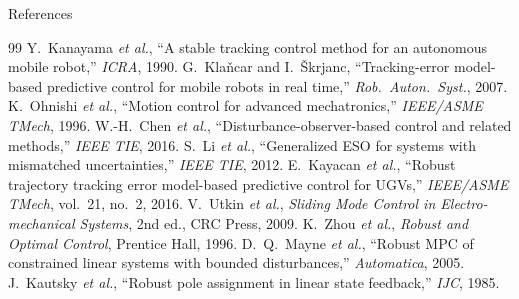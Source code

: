 \documentclass[10pt,aspectratio=169]{beamer}
\begin{document}
\begin{frame}[allowframebreaks]{References}
  \footnotesize
  \begin{thebibliography}{99}
     Y.~Kanayama \textit{et al.},
      ``A stable tracking control method for an autonomous mobile robot,''
      \emph{ICRA}, 1990.
     G.~Kla\v{n}car and I.~\v{S}krjanc,
      ``Tracking-error model-based predictive control for mobile robots
      in real time,'' \emph{Rob.\ Auton.\ Syst.}, 2007.
     K.~Ohnishi \textit{et al.},
      ``Motion control for advanced mechatronics,''
      \emph{IEEE/ASME TMech}, 1996.
     W.-H.\ Chen \textit{et al.},
      ``Disturbance-observer-based control and related methods,''
      \emph{IEEE TIE}, 2016.
     S.~Li \textit{et al.},
      ``Generalized ESO for systems with mismatched uncertainties,''
      \emph{IEEE TIE}, 2012.
     E.~Kayacan \textit{et al.},
      ``Robust trajectory tracking error model-based predictive control
      for UGVs,'' \emph{IEEE/ASME TMech}, vol.~21, no.~2, 2016.
     V.~Utkin \textit{et al.},
      \emph{Sliding Mode Control in Electro-mechanical Systems},
      2nd ed., CRC Press, 2009.
     K.~Zhou \textit{et al.},
      \emph{Robust and Optimal Control}, Prentice Hall, 1996.
     D.~Q.\ Mayne \textit{et al.},
      ``Robust MPC of constrained linear systems with bounded
      disturbances,'' \emph{Automatica}, 2005.
     J.~Kautsky \textit{et al.},
      ``Robust pole assignment in linear state feedback,''
      \emph{IJC}, 1985.
  \end{thebibliography}
\end{frame}
\end{document}
